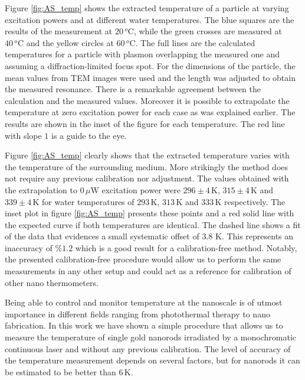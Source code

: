 \documentclass[journal=nalefd,manuscript=letter]{achemso}
\newcommand{\K}{\ensuremath{\,\textrm{K}}}
\newcommand{\uW}{\ensuremath{\,\mu\textrm{W}}}
\newcommand{\degree}{\ensuremath{\,^o\textrm{C}}}
\begin{document}
Figure \ref{fig:AS_temp} shows the extracted temperature of a particle at
varying excitation powers and at different water temperatures. The blue squares
are the results of the measurement at $20\degree$, while the green crosses are measured
at $40\degree$ and the yellow circles at $60\degree$. The full lines are the
calculated temperatures for a particle with plasmon overlapping the measured one
and assuming a diffraction-limited focus spot. For the dimensions of the
particle, the mean values from TEM images were used and the length was adjusted
to obtain the measured resonance. There is a remarkable agreement between the
calculation and the measured values. Moreover it is possible to extrapolate the
temperature at zero excitation power for each case as was explained earlier. The
results are shown in the inset of the figure for each temperature. The red line
with slope $1$ is a guide to the eye.

Figure \ref{fig:AS_temp} clearly shows that the extracted temperature varies
with the temperature of the surrounding medium. More strikingly the method does
not require any previous calibration nor adjustment. The values obtained with
the extrapolation to $0\uW$ excitation power were $296 \pm 4\K$, $315\pm 4\K$
and $339 \pm 4\K$ for water temperatures of $293\K$, $313\K$ and $333\K$
respectively. The inset plot in figure \ref{fig:AS_temp} presents these points 
and a red solid line with the expected curve if both temperatures are identical. The 
dashed line shows a fit of the data that evidences a small systematic offset of $3.8\,\K$. This represents
an inaccuracy of $\%1.2$ which is a good result for a calibration-free method.
Notably, the presented calibration-free procedure would allow us to perform the same
measurements in any other setup and could act as a reference for calibration of
other nano thermometers.


Being able to control and monitor temperature at the nanoscale is of utmost
importance in different fields ranging from photothermal therapy\cite{Huang2006}
to nano fabrication\cite{Fedoruk2013}. In this work we have shown a simple
procedure that allows us to measure the temperature of single gold nanorods
irradiated by a monochromatic continuous laser and without any previous
calibration. The level of accuracy of the temperature measurement depends on
several factors, but for nanorods it can be estimated to be better than $6\K$.
\end{document}
